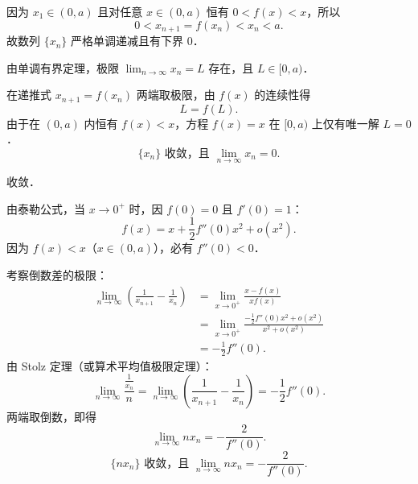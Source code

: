 \begin{solution}

    因为 $x_1 \in (0, a)$ 且对任意 $x \in (0, a)$ 恒有 $0 < f(x) < x$，所以
    \begin{equation}
        0 < x_{n+1} = f(x_n) < x_n < a.
    \end{equation}
    故数列 $\{x_n\}$ 严格单调递减且有下界 $0$．

    由单调有界定理，极限 $\lim_{n\to\infty} x_n = L$ 存在，且 $L \in [0, a)$．

    在递推式 $x_{n+1} = f(x_n)$ 两端取极限，由 $f(x)$ 的连续性得
    \begin{equation}
        L = f(L).
    \end{equation}
    由于在 $(0, a)$ 内恒有 $f(x) < x$，方程 $f(x) = x$ 在 $[0, a)$ 上仅有唯一解 $L = 0$．
    \begin{equation}
        \boxed{\{x_n\} \text{ 收敛，且 } \lim_{n\to\infty} x_n = 0.}
    \end{equation}

     收敛．

    由泰勒公式，当 $x \to 0^+$ 时，因 $f(0) = 0$ 且 $f'(0) = 1$：
    \begin{equation}
        f(x) = x + \frac{1}{2}f''(0)x^2 + o(x^2).
    \end{equation}
    因为 $f(x) < x$（$x \in (0, a)$），必有 $f''(0) < 0$．

    考察倒数差的极限：
    \begin{equation}
        \begin{aligned}
            \lim_{n\to\infty} \left( \frac{1}{x_{n+1}} - \frac{1}{x_n} \right) & = \lim_{x\to 0^+} \frac{x - f(x)}{x f(x)}                             \\
                                                                               & = \lim_{x\to 0^+} \frac{-\frac{1}{2}f''(0)x^2 + o(x^2)}{x^2 + o(x^2)} \\
                                                                               & = -\frac{1}{2}f''(0).
        \end{aligned}
    \end{equation}
    由 Stolz 定理（或算术平均值极限定理）：
    \begin{equation}
        \lim_{n\to\infty} \frac{\frac{1}{x_n}}{n} = \lim_{n\to\infty} \left( \frac{1}{x_{n+1}} - \frac{1}{x_n} \right) = -\frac{1}{2}f''(0).
    \end{equation}
    两端取倒数，即得
    \begin{equation}
        \lim_{n\to\infty} n x_n = -\frac{2}{f''(0)}.
    \end{equation}
    \begin{equation}
        \boxed{\{n x_n\} \text{ 收敛，且 } \lim_{n\to\infty} n x_n = -\frac{2}{f''(0)}.}
    \end{equation}
\end{solution}

\endinput
